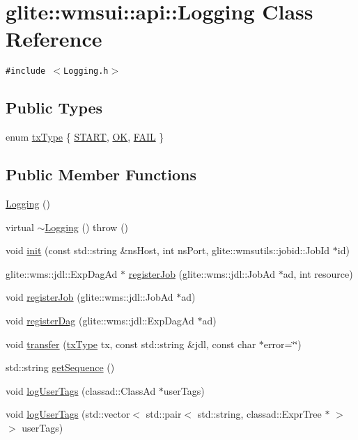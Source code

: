 \hypertarget{classglite_1_1wmsui_1_1api_1_1Logging}{
\section{glite::wmsui::api::Logging Class Reference}
\label{classglite_1_1wmsui_1_1api_1_1Logging}
}
{\tt \#include $<$Logging.h$>$}

\subsection*{Public Types}
\begin{CompactItemize}
\item 
enum \hyperlink{classglite_1_1wmsui_1_1api_1_1Logging_w3}{tx\-Type} \{ \hyperlink{classglite_1_1wmsui_1_1api_1_1Logging_w3w0}{START}, 
\hyperlink{classglite_1_1wmsui_1_1api_1_1Logging_w3w1}{OK}, 
\hyperlink{classglite_1_1wmsui_1_1api_1_1Logging_w3w2}{FAIL}
 \}
\end{CompactItemize}
\subsection*{Public Member Functions}
\begin{CompactItemize}
\item 
\hyperlink{classglite_1_1wmsui_1_1api_1_1Logging_a0}{Logging} ()
\item 
virtual \hyperlink{classglite_1_1wmsui_1_1api_1_1Logging_a1}{$\sim$Logging} ()  throw ()
\item 
void \hyperlink{classglite_1_1wmsui_1_1api_1_1Logging_a2}{init} (const std::string \&ns\-Host, int ns\-Port, glite::wmsutils::jobid::Job\-Id $\ast$id)
\item 
glite::wms::jdl::Exp\-Dag\-Ad $\ast$ \hyperlink{classglite_1_1wmsui_1_1api_1_1Logging_a3}{register\-Job} (glite::wms::jdl::Job\-Ad $\ast$ad, int resource)
\item 
void \hyperlink{classglite_1_1wmsui_1_1api_1_1Logging_a4}{register\-Job} (glite::wms::jdl::Job\-Ad $\ast$ad)
\item 
void \hyperlink{classglite_1_1wmsui_1_1api_1_1Logging_a5}{register\-Dag} (glite::wms::jdl::Exp\-Dag\-Ad $\ast$ad)
\item 
void \hyperlink{classglite_1_1wmsui_1_1api_1_1Logging_a6}{transfer} (\hyperlink{classglite_1_1wmsui_1_1api_1_1Logging_w3}{tx\-Type} tx, const std::string \&jdl, const char $\ast$error=\char`\"{}\char`\"{})
\item 
std::string \hyperlink{classglite_1_1wmsui_1_1api_1_1Logging_a7}{get\-Sequence} ()
\item 
void \hyperlink{classglite_1_1wmsui_1_1api_1_1Logging_a8}{log\-User\-Tags} (classad::Class\-Ad $\ast$user\-Tags)
\item 
void \hyperlink{classglite_1_1wmsui_1_1api_1_1Logging_a9}{log\-User\-Tags} (std::vector$<$ std::pair$<$ std::string, classad::Expr\-Tree $\ast$ $>$ $>$ user\-Tags)
\end{CompactItemize}


